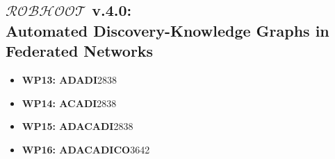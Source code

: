 \documentclass[12pt, a4paper]{article} %
\begin{document}
  \subsection{{\bf $\mathcal{ROBHOOT}$ v.4.0}: \\ Automated
    Discovery-Knowledge Graphs in Federated Networks}

  \begin{itemize}
  \item {\bf WP13: ADADI}{28}{38}\\%
  \item {\bf WP14: ACADI}{28}{38}\\%
  \item {\bf WP15:
      ADACADI}{28}{38}\\%
  \item {\bf WP16:
      ADACADICO}{36}{42}\\%
  \end{itemize}
  
\end{document}
